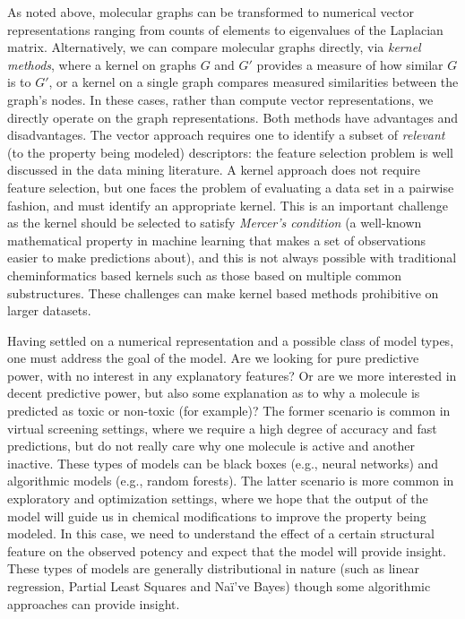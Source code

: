 \documentclass{sig-alternate}
\begin{document}
As noted above, molecular graphs can be transformed to numerical
vector representations ranging from counts of elements to eigenvalues
of the Laplacian matrix.  Alternatively, we can compare molecular
graphs directly, via \emph{kernel methods}, where a kernel on graphs
$G$ and $G'$ provides a measure of how similar $G$ is to $G'$, or a
kernel on a single graph compares measured similarities between the
graph's nodes. In these cases, rather than compute vector
representations, we directly operate on the graph representations.
Both methods have advantages and disadvantages. The vector approach
requires one to identify a subset of \emph{relevant} (to the property
being modeled) descriptors: the feature selection problem is
well discussed in the data mining literature. A kernel approach
does not require feature selection, but one faces the problem of
evaluating a data set in a pairwise fashion, and must
identify an appropriate kernel. This is an important challenge as the
kernel should be selected to satisfy \emph{Mercer's condition} (a
well-known mathematical property in machine learning that makes a set
of observations easier to make predictions about), and this is not
always possible with traditional cheminformatics based kernels such as those based on multiple common substructures.
These challenges can
make kernel based methods prohibitive on larger datasets.

Having settled on a numerical representation and a possible class of
model types, one must address the goal of the model. Are we looking
for pure predictive power, with no interest in any explanatory
features? Or are we more interested in decent predictive power, but
also some explanation as to why a molecule is predicted as toxic or
non-toxic (for example)? The former scenario is common in virtual
screening settings, where we require a high degree of accuracy and
fast predictions, but do not really care why one molecule is active
and another inactive. These types of models can be black boxes (e.g.,
neural networks) and algorithmic models \cite{Breiman:2001fk} (e.g., random
forests). The latter scenario is more common in exploratory and
optimization settings, where we hope that the output of the model will
guide us in chemical modifications to improve the property being
modeled.  In this case, we need to understand the effect of a certain
structural feature on the observed potency and expect that the model
will provide insight. These types of models are generally
distributional in nature (such as linear regression, Partial Least
Squares and Na\"{i'}ve Bayes) though some algorithmic approaches
 can provide insight.
\end{document}
